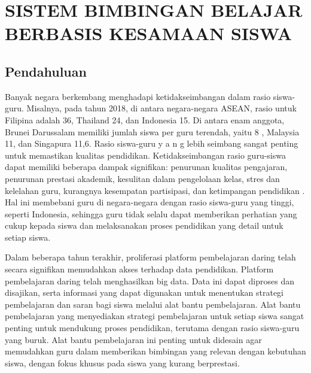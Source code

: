 \chapter{SISTEM BIMBINGAN BELAJAR BERBASIS KESAMAAN SISWA}

\section{Pendahuluan}

    Banyak negara berkembang menghadapi ketidakseimbangan dalam rasio siswa- guru. Misalnya, pada tahun 2018, di antara negara-negara ASEAN, rasio untuk Filipina adalah 36, Thailand 24, dan Indonesia 15. Di antara enam anggota, Brunei Darussalam memiliki jumlah siswa per guru terendah, yaitu 8 , Malaysia 11, dan Singapura 11,6. Rasio siswa-guru y a n g lebih seimbang sangat penting untuk memastikan kualitas pendidikan. Ketidakseimbangan rasio guru-siswa dapat memiliki beberapa dampak signifikan: penurunan kualitas pengajaran, penurunan prestasi akademik, kesulitan dalam pengelolaan kelas, stres dan kelelahan guru, kurangnya kesempatan partisipasi, dan ketimpangan pendidikan \citep{Ancho2021}. Hal ini membebani guru di negara-negara dengan rasio siswa-guru yang tinggi, seperti Indonesia, sehingga guru tidak selalu dapat memberikan perhatian yang cukup kepada siswa dan melaksanakan proses pendidikan yang detail untuk setiap siswa.

    Dalam beberapa tahun terakhir, proliferasi platform pembelajaran daring telah secara signifikan memudahkan akses terhadap data pendidikan. Platform pembelajaran daring telah menghasilkan big data. Data ini dapat diproses dan disajikan, serta informasi yang dapat digunakan untuk menentukan strategi pembelajaran dan saran bagi siswa melalui alat bantu pembelajaran. Alat bantu pembelajaran yang menyediakan strategi pembelajaran untuk setiap siswa sangat penting untuk mendukung proses pendidikan, terutama dengan rasio siswa-guru yang buruk. Alat bantu pembelajaran ini penting untuk didesain agar memudahkan guru dalam memberikan bimbingan yang relevan dengan kebutuhan siswa, dengan fokus khusus pada siswa yang kurang berprestasi.
    
